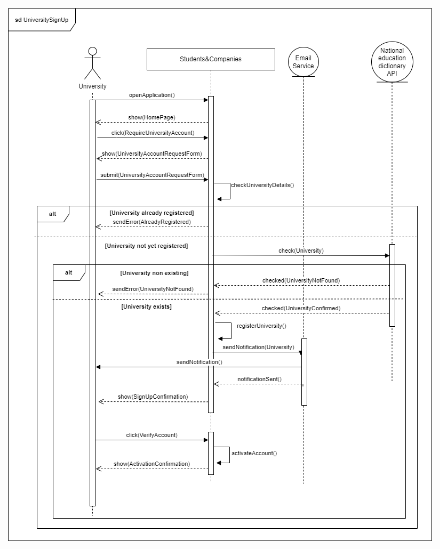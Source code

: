 \documentclass[a4paper,12pt]{article}
\begin{document}
\begin{figure}[H]
    \centering
    \includegraphics[scale = 0.45]{figures/UseCasesSD/UniversitySignUp.drawio.png}
\end{figure}
\end{document}
